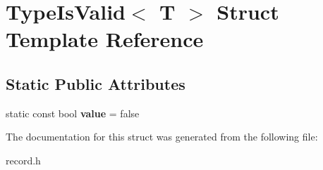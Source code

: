 \hypertarget{struct_type_is_valid}{\section{Type\-Is\-Valid$<$ T $>$ Struct Template Reference}
\label{struct_type_is_valid}
}
\subsection*{Static Public Attributes}
\begin{DoxyCompactItemize}
\item 
\hypertarget{struct_type_is_valid_aaebef75098d48be14ff63ee9fd15a58a}{static const bool {\bfseries value} = false}\label{struct_type_is_valid_aaebef75098d48be14ff63ee9fd15a58a}

\end{DoxyCompactItemize}


The documentation for this struct was generated from the following file\-:\begin{DoxyCompactItemize}
\item 
record.\-h\end{DoxyCompactItemize}
